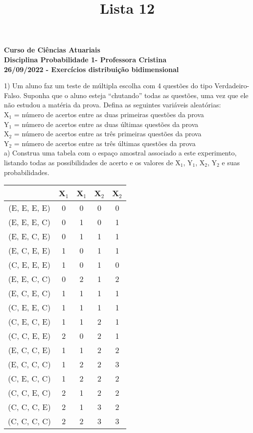 \documentclass[12pt,a4paper,draft]{article}
\title{Lista 12}
\date{}
\begin{document}
	\maketitle
	\begin{center}
		\textbf{Curso de Ciências Atuariais}\\
		\textbf{Disciplina Probabilidade 1- Professora Cristina}\\
		\textbf{26/09/2022 - Exercícios distribuição bidimensional}
	\end{center}
	1) Um aluno faz um teste de múltipla escolha com 4 questões do tipo Verdadeiro-Falso. Suponha que o aluno esteja “chutando” todas as questões, uma vez que ele não estudou a matéria da prova. Defina as seguintes variáveis aleatórias:\\
	X$_{1}$ = número de acertos entre as duas primeiras questões da prova\\
	Y$_{1}$ = número de acertos entre as duas últimas questões da prova\\
	X$_{2}$ = número de acertos entre as três primeiras questões da prova\\
	Y$_{2}$ = número de acertos entre as três últimas questões da prova\\
	a) Construa uma tabela com o espaço amostral associado a este experimento, listando todas as possibilidades de acerto e os valores de X$_{1}$, Y$_{1}$, X$_{2}$, Y$_{2}$ e suas probabilidades.
	\vspace{1cm}\\
	\begin{center}
		\begin{tabular}{ccccc}\midrule
			 & X$_{1}$ & X$_{1}$ & X$_{2}$ & X$_{2}$\\ \midrule
			(E, E, E, E) & 0 & 0 & 0 & 0\\ \midrule
			(E, E, E, C) & 0 & 1 & 0 & 1\\ \midrule
			(E, E, C, E) & 0 & 1 & 1 & 1\\ \midrule
			(E, C, E, E) & 1 & 0 & 1 & 1\\ \midrule
			(C, E, E, E) & 1 & 0 & 1 & 0\\ \midrule
			(E, E, C, C) & 0 & 2 & 1 & 2\\ \midrule
			(E, C, E, C) & 1 & 1 & 1 & 1\\ \midrule
			(C, E, E, C) & 1 & 1 & 1 & 1\\ \midrule
			(C, E, C, E) & 1 & 1 & 2 & 1\\ \midrule
			(C, C, E, E) & 2 & 0 & 2 & 1\\ \midrule
			(E, C, C, E) & 1 & 1 & 2 & 2\\ \midrule
			(E, C, C, C) & 1 & 2 & 2 & 3\\ \midrule
			(C, E, C, C) & 1 & 2 & 2 & 2\\ \midrule
			(C, C, E, C) & 2 & 1 & 2 & 2\\ \midrule
			(C, C, C, E) & 2 & 1 & 3 & 2\\ \midrule
			(C, C, C, C) & 2 & 2 & 3 & 3\\ \midrule
		\end{tabular}
	\end{center}
\end{document}
